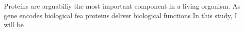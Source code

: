 Proteins are arguabiliy the most important component in a living organism. As gene encodes biological fea proteins deliver biological functions   In this study, I will be 